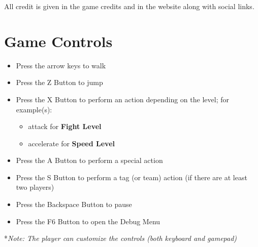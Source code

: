\documentclass[12pt]{article}
\begin{document}
\begin{center}
\begin{supertabular}{c|x{2in}|x{1.75in}}
\end{supertabular}
\end{center}

\noindent All credit is given in the game credits and in the website along with social links.
\onecolumn

\section{Game Controls}
\begin{itemize}[noitemsep]
\item Press the arrow keys to walk
\item Press the Z Button to jump
\item Press the X Button to perform an action depending on the level; for example(s):
\begin{itemize}[noitemsep,nosep]
\item attack for \textbf{Fight Level}
\item accelerate for \textbf{Speed Level}
\end{itemize}
\item Press the A Button to perform a special action
\item Press the S Button to perform a tag (or team) action (if there are at least two players)
\item Press the Backspace Button to pause
\item Press the F6 Button to open the Debug Menu
\end{itemize}
*\textit{Note: The player can customize the controls (both keyboard and gamepad)}
\vfill
\end{document}
